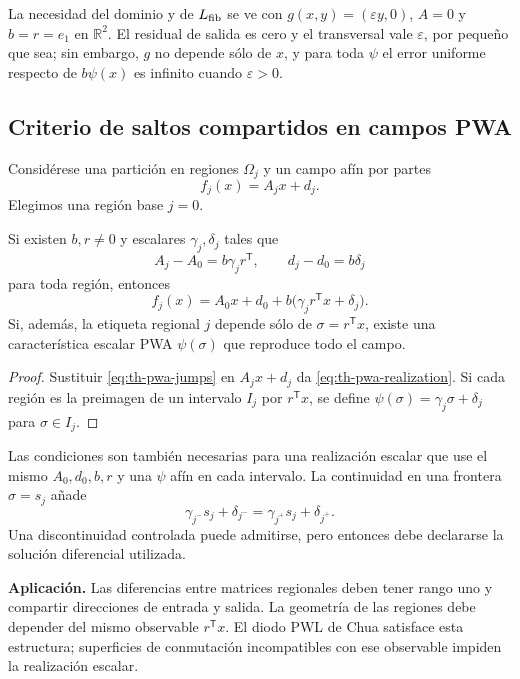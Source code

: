 La necesidad del dominio y de \(L_{\rm fib}\) se ve con
\(g(x,y)=(\varepsilon y,0)\), \(A=0\) y \(b=r=e_1\) en
\(\mathbb R^2\). El residual de salida es cero y el transversal vale
\(\varepsilon\), por pequeño que sea; sin embargo, \(g\) no depende sólo de
\(x\), y para toda \(\psi\) el error uniforme respecto de
\(b\psi(x)\) es infinito cuando \(\varepsilon>0\).

\subsection{Criterio de saltos compartidos en campos PWA}
\label{sec:pwa-shared-jumps}

Considérese una partición en regiones \(\Omega_j\) y un campo afín por partes
\[
 f_j(x)=A_jx+d_j.
\]
Elegimos una región base \(j=0\).

\begin{proposition}
\label{prop:pwa-shared}
Si existen \(b,r\neq0\) y escalares \(\gamma_j,\delta_j\) tales que
\begin{equation}
 A_j-A_0=b\gamma_jr^{\mathsf T},\qquad
 d_j-d_0=b\delta_j
 \label{eq:th-pwa-jumps}
\end{equation}
para toda región, entonces
\begin{equation}
 f_j(x)=A_0x+d_0+b\bigl(\gamma_jr^{\mathsf T}x+\delta_j\bigr).
 \label{eq:th-pwa-realization}
\end{equation}
Si, además, la etiqueta regional \(j\) depende sólo de
\(\sigma=r^{\mathsf T}x\), existe una característica escalar PWA
\(\psi(\sigma)\) que reproduce todo el campo.
\end{proposition}

\begin{proof}
Sustituir \cref{eq:th-pwa-jumps} en
\(A_jx+d_j\) da \cref{eq:th-pwa-realization}. Si cada región es la preimagen
de un intervalo \(I_j\) por \(r^{\mathsf T}x\), se define
\(\psi(\sigma)=\gamma_j\sigma+\delta_j\) para \(\sigma\in I_j\).
\end{proof}

Las condiciones son también necesarias para una realización escalar que use
el mismo \(A_0,d_0,b,r\) y una \(\psi\) afín en cada intervalo. La continuidad
en una frontera \(\sigma=s_j\) añade
\[
 \gamma_{j^-}s_j+\delta_{j^-}
 =\gamma_{j^+}s_j+\delta_{j^+}.
\]
Una discontinuidad controlada puede admitirse, pero entonces debe declararse
la solución diferencial utilizada.

\begin{proposalbox}
\textbf{Aplicación.} Las diferencias entre matrices regionales deben tener
rango uno y compartir direcciones de entrada y salida. La geometría de las
regiones debe depender del mismo observable \(r^{\mathsf T}x\). El diodo
PWL de Chua satisface esta estructura; superficies de conmutación incompatibles
con ese observable impiden la realización escalar.
\end{proposalbox}

